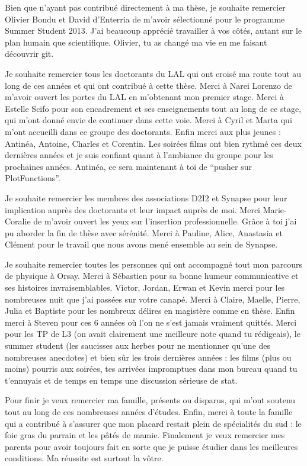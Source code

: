 Bien que n'ayant pas contribué directement à ma thèse, je souhaite remercier Olivier Bondu et David d'Enterria de m'avoir sélectionné pour le programme Summer Student 2013.
J'ai beaucoup apprécié travailler à vos côtés, autant sur le plan humain que scientifique.
Olivier, tu as changé ma vie en me faisant découvrir git.

Je souhaite remercier tous les doctorants du LAL qui ont croisé ma route tout au long de ces années et qui ont contribué à cette thèse.
Merci à Narei Lorenzo de m'avoir ouvert les portes du LAL en m'obtenant mon premier stage.
Merci à Estelle Scifo pour son encadrement et ses enseignements tout au long de ce stage, qui m'ont donné envie de continuer dans cette voie.
Merci à Cyril et Marta qui m'ont accueilli dans ce groupe des doctorants.
Enfin merci aux plus jeunes : Antinéa, Antoine, Charles et Corentin.
Les soirées films ont bien rythmé ces deux dernières années et je suis confiant quant à l'ambiance du groupe pour les prochaines années.
Antinéa, ce sera maintenant à toi de ``pusher sur PlotFunctions''.


Je souhaite remercier les membres des associations D2I2 et Synapse pour leur implication auprès des doctorants et leur impact auprès de moi.
Merci Marie-Coralie de m'avoir ouvert les yeux sur l'insertion professionnelle.
Grâce à toi j'ai pu aborder la fin de thèse avec sérénité.
Merci à Pauline, Alice, Anastasia et Clément pour le travail que nous avons mené ensemble au sein de Synapse.


Je souhaite remercier toutes les personnes qui ont accompagné tout mon parcours de physique à Orsay.
Merci à Sébastien pour sa bonne humeur communicative et ses histoires invraisemblables.
Victor, Jordan, Erwan et Kevin merci pour les nombreuses nuit que j'ai passées sur votre canapé.
Merci à Claire, Maelle, Pierre, Julia et Baptiste pour les nombreux délires en magistère comme en thèse.
Enfin merci à Steven pour ces 6 années où l'on ne s'est jamais vraiment quittés.
Merci pour les TP de L3 (on avait clairement une meilleure note quand tu rédigeais), le summer student (les saucisses aux herbes pour ne mentionner qu'une des nombreuses anecdotes) et bien sûr les trois dernières années : les films (plus ou moins) pourris aux soirées, tes arrivées impromptues dans mon bureau quand tu t'ennuyais et de temps en temps une discussion sérieuse de stat.

Pour finir je veux remercier ma famille, présents ou disparus,  qui m'ont soutenu tout au long de ces nombreuses années d'études.
Enfin, merci à toute la famille qui a contribué à s'assurer que mon placard restait plein de spécialités du sud : le foie gras du parrain et les pâtés de mamie.
Finalement je veux remercier mes parents pour avoir toujours fait en sorte que je puisse étudier dans les meilleures conditions.
Ma réussite est surtout la vôtre.




